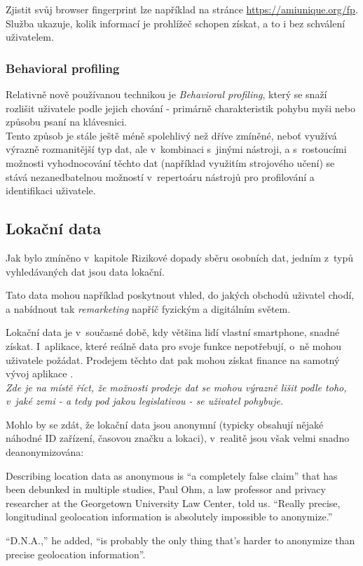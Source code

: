 Zjistit svůj browser fingerprint lze například na stránce \url{https://amiunique.org/fp}. Služba ukazuje, kolik informací je prohlížeč schopen získat, a to i bez schválení uživatelem. 

\subsubsection{Behavioral profiling}
Relativně nově používanou technikou je \textit{Behavioral profiling}, který se snaží rozlišit uživatele podle jejich chování - primárně charakteristik pohybu myši nebo způsobu psaní na klávesnici\citep{behavioral-profiling}\citep{mouse-behavioral-biometrics}\citep{digital-behavior-fingerprint}.\\
Tento způsob je stále ještě méně spolehlivý než dříve zmíněné, neboť využívá výrazně rozmanitější typ dat, ale v~kombinaci s~jinými nástroji, a s~rostoucími možnosti vyhodnocování těchto dat (například využitím strojového učení) se stává nezanedbatelnou možností v~repertoáru nástrojů pro profilování a identifikaci uživatele.

\subsection{Lokační data}
Jak bylo zmíněno v~kapitole Rizikové dopady sběru osobních dat, jedním z~typů vyhledávaných dat jsou data lokační.

Tato data mohou například poskytnout vhled, do jakých obchodů uživatel chodí, a nabídnout tak \textit{remarketing} napříč fyzickým a digitálním světem.

Lokační data je v~současné době, kdy většina lidí vlastní smartphone, snadné získat. I~aplikace, které reálně data pro svoje funkce nepotřebují, o~ně mohou uživatele požádat. Prodejem těchto dat pak mohou získat finance na samotný vývoj aplikace .\\
\textit{Zde je na místě říct, že možnosti prodeje dat se mohou výrazně lišit podle toho, v~jaké zemi - a tedy pod jakou legislativou - se uživatel pohybuje.}

Mohlo by se zdát, že lokační data jsou anonymní (typicky obsahují nějaké náhodné ID zařízení, časovou značku a lokaci), v~realitě jsou však velmi snadno deanonymizována:
\begin{blockquote}
Describing location data as anonymous is “a completely false claim” that has been debunked in multiple studies, Paul Ohm, a law professor and privacy researcher at the Georgetown University Law Center, told us. “Really precise, longitudinal geolocation information is absolutely impossible to anonymize.”

“D.N.A.,” he added, “is probably the only thing that’s harder to anonymize than precise geolocation information”\citep{location-data}.
\end{blockquote}


